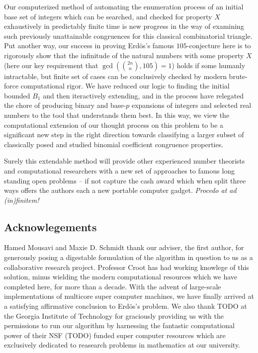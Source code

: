\documentclass[12pt]{article}
\begin{document}
Our computerized method of automating the enumeration process 
of an initial base set of integers which can be searched, and checked for property $X$ exhaustively in 
predictably finite time is new progress in the way of examining such previously unattainable 
congruences for this classical combinatorial triangle. Put another way, our success in proving 
Erd\"os's famous $105$-conjecture here is to rigorously show that the infinitude of the natural numbers 
with some property $X$ (here our key requirement that $\gcd(\binom{2n}{n}, 105)=1$) holds if 
some humanly intractable, but finite set of cases can be conclusively checked by modern brute-force 
computational rigor. We have reduced our logic to finding the initial bounded $B_1$ and 
then iteractively extending, and in the process have relegated the chore of producing binary and 
base-$p$ expansions of integers and selected real numbers to the tool that understands them best. 
In this way, we view the computational extension of our thought process on this problem to be a 
significant new step in the right direction towards classifying a larger subset of classically 
posed and studied binomial coefficient congruence properties. 

Surely this extendable method will 
provide other experienced number theorists and computational researchers with a new set of 
approaches to famous long standing open problems -- if not capture the cash award which when 
split three ways offers the authors each a new portable computer gadget. 
\emph{Procedo at ad (in)finitem!}

\subsection*{Acknowlegements} 

Hamed Mousavi and Maxie D. Schmidt thank our adviser, the first author, 
for generously posing a digestable formulation of the algorithm in question to us as a 
collaborative research project. Professor Croot has had working knowlege of this solution, minus 
wielding the modern computational resources which we have completed here, for more than a decade. 
With the advent of large-scale implementations of multicore super computer machines, we have finally 
arrived at a satisfying affirmative conclusion to Erd\"os's problem. 
We also thank TODO at the Georgia Institute of Technology for graciously providing us with the 
permissions to run our algorithm by harnessing the fantastic computational power of their NSF (TODO) 
funded super computer resources which are exclusively dedicated to reasearch problems in mathematics at 
our university. 
\end{document}

